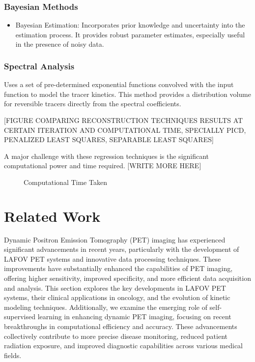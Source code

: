\subsubsection{Bayesian Methods}
\begin{itemize}
    \item Bayesian Estimation: Incorporates prior knowledge and uncertainty into the estimation process. It provides robust parameter estimates, especially useful in the presence of noisy data.
\end{itemize}

\subsubsection{Spectral Analysis}
Uses a set of pre-determined exponential functions convolved with the input function to model the tracer kinetics. This method provides a distribution volume for reversible tracers directly from the spectral coefficients.

[FIGURE COMPARING RECONSTRUCTION TECHNIQUES RESULTS AT CERTAIN ITERATION AND COMPUTATIONAL TIME, SPECIALLY PICD, PENALIZED LEAST SQUARES, SEPARABLE LEAST SQUARES]


A major challenge with these regression techniques is the significant computational power and time required. [WRITE MORE HERE]

\begin{figure}[h]
    \centering
    \caption{Computational Time Taken}
    \label{fig:computational_time}
\end{figure}


\section{Related Work}

Dynamic Positron Emission Tomography (PET) imaging has experienced significant advancements in recent years, particularly with the development of LAFOV PET systems and innovative data processing techniques. These improvements have substantially enhanced the capabilities of PET imaging, offering higher sensitivity, improved specificity, and more efficient data acquisition and analysis. This section explores the key developments in LAFOV PET systems, their clinical applications in oncology, and the evolution of kinetic modeling techniques. Additionally, we examine the emerging role of self-supervised learning in enhancing dynamic PET imaging, focusing on recent breakthroughs in computational efficiency and accuracy. These advancements collectively contribute to more precise disease monitoring, reduced patient radiation exposure, and improved diagnostic capabilities across various medical fields.
